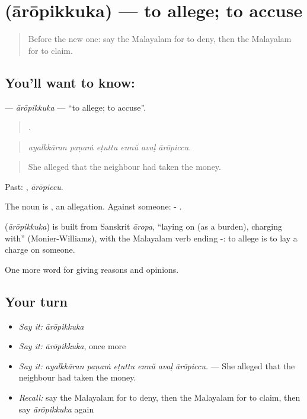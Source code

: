 \section[\texorpdfstring{\ml{ആരോപിക്കുക} (ārōpikkuka)}{ആരോപിക്കുക (ārōpikkuka)}]{ (ārōpikkuka) — to allege; to accuse}

\label{lesson:ML-C409-aropikkuka}



\begin{quote}
Before the new one: say the Malayalam for to deny, then the Malayalam for to claim.
\end{quote}

\subsection*{You'll want to know: }
\textbf{} — \emph{ārōpikkuka} — \textquotedblleft{}to allege; to accuse\textquotedblright{}.

\begin{quote}
     .
\end{quote}

\begin{quote}
\emph{ayalkkāran paṇaṁ eṭuttu ennŭ avaḷ ārōpiccu.}
\end{quote}

\begin{quote}
She alleged that the neighbour had taken the money.
\end{quote}

Past: , \emph{ārōpiccu}.

The noun is , an allegation. Against someone: - .

\begin{cousinweb}
\textbf{} (\emph{ārōpikkuka}) is built from Sanskrit \emph{āropa}, \textquotedblleft{}laying on (as a burden), charging with\textquotedblright{} (Monier-Williams), with the Malayalam verb ending -: to allege is to lay a charge on someone.
\end{cousinweb}

\begin{grammarlens}[title={What you've built}]
One more word for giving reasons and opinions.
\end{grammarlens}

\subsection*{Your turn}
\begin{itemize}
\raggedright
  \item \emph{Say it:} \emph{ārōpikkuka}
  \item \emph{Say it:} \emph{ārōpikkuka}, once more
  \item \emph{Say it:} \emph{ayalkkāran paṇaṁ eṭuttu ennŭ avaḷ ārōpiccu.} — She alleged that the neighbour had taken the money.
  \item \emph{Recall:} say the Malayalam for to deny, then the Malayalam for to claim, then say \emph{ārōpikkuka} again
\end{itemize}

